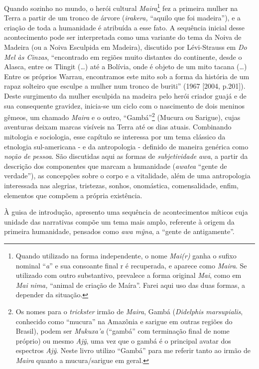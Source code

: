 Quando sozinho no mundo, o herói cultural \emph{Maira}\footnote{Quando
  utilizado na forma independente, o nome \emph{Mai(r)} ganha o sufixo
  nominal ``\emph{a}'' e sua consoante final r é recuperada, e aparece
  como \emph{Maira}. Se utilizado com outro substantivo, prevalece a
  forma original \emph{Mai}, como em \emph{Mai} \emph{nima,} ``animal de
      criação de Maíra''. Farei aqui uso das duas formas, a depender da
  situação.} fez a primeira mulher na Terra a partir de um tronco de
árvore (\emph{irakera,} ``aquilo que foi madeira''), e a criação de toda a
humanidade é atribuída a esse fato. A sequência inicial desse
acontecimento pode ser interpretada como uma variante do tema da Noiva
de Madeira (ou a Noiva Esculpida em Madeira), discutido por Lévi-Strauss
em \emph{Do Mel às Cinzas}, ``encontrado em regiões muito distantes do
continente, desde o Alasca, entre os Tlingit (\ldots{}) até a Bolívia, onde é
objeto de um mito tacana (\ldots{}) Entre os próprios Warrau, encontramos
este mito sob a forma da história de um rapaz solteiro que esculpe a
mulher num tronco de buriti'' (1967 {[}2004, p.201{]}). Deste surgimento
da mulher esculpida na madeira pelo herói criador guajá e de sua
consequente gravidez, inicia-se um ciclo com o nascimento de dois
meninos gêmeos, um chamado \emph{Maira} e o outro, ``Gambá''\footnote{Os
  nomes para o \emph{trickster} irmão de \emph{Maira}, Gambá
  (\emph{Didelphis marsupialis}, conhecido como ``mucura'' na Amazônia e
  sarigue em outras regiões do Brasil), podem ser \emph{Mukuxa'a}
  (``gambá'' com terminação final de nome próprio) ou mesmo \emph{Ajỹ},
  uma vez que o gambá é o principal avatar dos espectros \emph{Ajỹ}.
  Neste livro utilizo ``Gambá'' para me referir tanto ao irmão de
  \emph{Maira} quanto a mucura/sarigue em geral.} (Mucura ou Sarigue),
cujas aventuras deixam marcas visíveis na Terra até os dias atuais.
Combinando mitologia e sociologia, esse capítulo se interessa por um
tema clássico da etnologia sul-americana - e da antropologia - definido
de maneira genérica como \emph{noção} \emph{de pessoa}. São discutidas
aqui as formas de \emph{subjetividade} \emph{awa}, a partir da descrição
dos componentes que marcam a humanidade (\emph{awatea} ``gente de
verdade''), as concepções sobre o corpo e a vitalidade, além de uma
antropologia interessada nas alegrias, tristezas, sonhos, onomástica,
comensalidade, enfim, elementos que compõem a própria existência.

À guisa de introdução, apresento uma sequência de acontecimentos míticos
cuja unidade das narrativas compõe um tema mais amplo, referente à
origem da primeira humanidade, pensados como \emph{awa mỹna}, a ``gente
de antigamente''.

